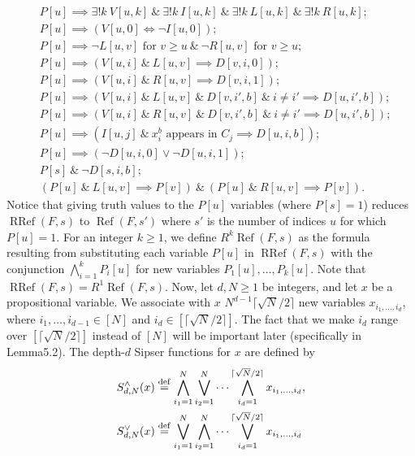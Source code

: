 \documentclass[10pt,a4paper]{article}
\newcommand{\RRef}{\operatorname{RRef}}
\renewcommand{\Ref}{\operatorname{Ref}}
\begin{document}
\begin{align*}
&P[u]\implies\exists!k\ V[u,k]\ \&\ \exists!k\ I[u,k]\ \&\ \exists!k\ L[u,k]\ \&\ \exists!k\ R[u,k];\tag{3.11}\\
&P[u]\implies(V[u,0]\iff\neg I[u,0]);\tag{3.12}\\
&P[u]\implies\neg L[u,v]\text{ for }v\ge u\ \&\ \neg R[u,v]\text{ for }v\ge u;\tag{3.13}\\
&P[u]\implies(V[u,i]\ \&\ L[u,v]\implies D[v,i,0]);\tag{3.14}\\
&P[u]\implies(V[u,i]\ \&\ R[u,v]\implies D[v,i,1]);\tag{3.15}\\
&P[u]\implies(V[u,i]\ \&\ L[u,v]\ \&\ D[v,i',b]\ \&\ i\ne i'\implies D[u,i',b]);\tag{3.16}\\
&P[u]\implies(V[u,i]\ \&\ R[u,v]\ \&\ D[v,i',b]\ \&\ i\ne i'\implies D[u,i',b]);\tag{3.17}\\
&P[u]\implies(I[u,j]\ \&\ x_i^b\text{ appears in }C_j\implies D[u,i,b]);\tag{3.18}\\
&P[u]\implies(\neg D[u,i,0]\vee\neg D[u,i,1]);\tag{3.19}\\
&P[s]\ \&\ \neg D[s,i,b];\tag{3.20}\\
&(P[u]\ \&\ L[u,v]\implies P[v])\ \&\ (P[u]\ \&\ R[u,v]\implies P[v]).\tag{3.21}
\end{align*}
Notice that giving truth values to the $P[u]$ variables (where $P[s]=1$) reduces $\RRef(F,s)$ to $\Ref(F,s')$ where $s'$ is the number of indices $u$ for which $P[u]=1$.
For an integer $k\ge1$, we define $R^k\Ref(F,s)$ as the formula resulting from substituting each variable $P[u]$ in $\RRef(F,s)$ with the conjunction $\bigwedge_{i=1}^kP_i[u]$ for new variables $P_1[u],\ldots,P_k[u]$. Note that $\RRef(F,s)=R^1\Ref(F,s)$.
Now, let $d,N\ge1$ be integers, and let $x$ be a propositional variable. We associate with $x$ $N^{d-1}\lceil\sqrt N/2\rceil$ new variables $x_{i_1,\ldots,i_d}$, where $i_1,\ldots,i_{d-1}\in[N]$ and $i_d\in[\lceil\sqrt N/2\rceil]$. The fact that we make $i_d$ range over $[\lceil\sqrt N/2\rceil]$ instead of $[N]$ will be important later (specifically in Lemma5.2). The depth-$d$ Sipser functions for $x$ are defined by
\begin{align*}
S_{d,N}^{\wedge}(x)&\stackrel{\rm def}=\bigwedge_{i_1=1}^N\bigvee_{i_2=1}^N\cdots\bigwedge_{i_d=1}^{\lceil\sqrt N/2\rceil}x_{i_1,\ldots,i_d},\\
S_{d,N}^{\vee}(x)&\stackrel{\rm def}=\bigvee_{i_1=1}^N\bigwedge_{i_2=1}^N\cdots\bigvee_{i_d=1}^{\lceil\sqrt N/2\rceil}x_{i_1,\ldots,i_d}
\end{align*}
\end{document}
